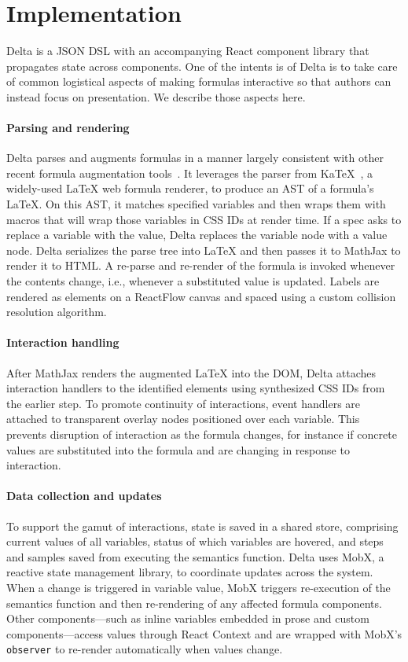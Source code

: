 \section{Implementation}

Delta is a JSON DSL with an accompanying React component library that propagates state across components. One of the intents is of Delta is to take care of common logistical aspects of making formulas interactive so that authors can instead focus on presentation. We describe those aspects here. 

\paragraph{Parsing and rendering}
Delta parses and augments formulas in a manner largely consistent with other recent formula augmentation tools~\cite{Wu2023-xc,tao2025freeform}. It leverages the parser from KaTeX~\cite{tool:katex}, a widely-used LaTeX web formula renderer, to produce an AST of a formula's LaTeX. On this AST, it matches specified variables and then wraps them with macros that will wrap those variables in CSS IDs at render time. If a spec asks to replace a variable with the value, Delta replaces the variable node with a value node. Delta serializes the parse tree into LaTeX and then passes it to MathJax to render it to HTML. A re-parse and re-render of the formula is invoked whenever the contents change, i.e., whenever a substituted value is updated. Labels are rendered as elements on a ReactFlow canvas and spaced using a custom collision resolution algorithm.

\paragraph{Interaction handling}
After MathJax renders the augmented LaTeX into the DOM, Delta attaches interaction handlers to the identified elements using synthesized CSS IDs from the earlier step. To promote continuity of interactions, event handlers are attached to transparent overlay nodes positioned over each variable. This prevents disruption of interaction as the formula changes, for instance if concrete values are substituted into the formula and are changing in response to interaction.

\paragraph{Data collection and updates}
To support the gamut of interactions, state is saved in a shared store, comprising current values of all variables, status of which variables are hovered, and steps and samples saved from executing the semantics function. Delta uses MobX, a reactive state management library, to coordinate updates across the system. When a change is triggered in variable value, MobX triggers re-execution of the semantics function and then re-rendering of any affected formula components. Other components---such as inline variables embedded in prose and custom components---access values through React Context and are wrapped with MobX's \texttt{observer} to re-render automatically when values change.